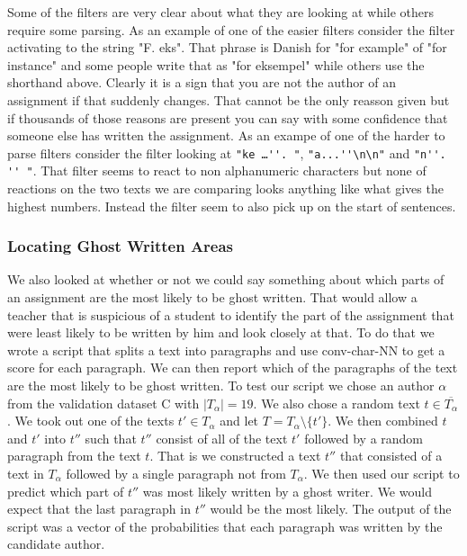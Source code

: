 Some of the filters are very clear about what they are looking at while others
require some parsing. As an example of one of the easier filters consider the
filter activating to the string "F. eks". That phrase is Danish for "for
example" of "for instance" and some people write that as "for eksempel" while
others use the shorthand above. Clearly it is a sign that you are not the author
of an assignment if that suddenly changes. That cannot be the only reasson given
but if thousands of those reasons are present you can say with some confidence
that someone else has written the assignment. As an exampe of one of the harder
to parse filters consider the filter looking at \verb["ke …''. "[,
\verb["a...''\n\n"[ and \verb["n''. '' "[. That filter seems to react to non
alphanumeric characters but none of reactions on the two texts we are comparing
looks anything like what gives the highest numbers. Instead the filter seem to
also pick up on the start of sentences.


\subsubsection{Locating Ghost Written Areas}

We also looked at whether or not we could say something about which parts of an
assignment are the most likely to be ghost written. That would allow a teacher
that is suspicious of a student to identify the part of the assignment that were
least likely to be written by him and look closely at that. To do that we wrote
a script that splits a text into paragraphs and use \gls{conv-char-NN} to get a
score for each paragraph. We can then report which of the paragraphs of the text
are the most likely to be ghost written. To test our script we chose an author
$\alpha$ from the validation dataset C with $|T_\alpha| = 19$. We also chose a
random text $t \in \overline{T_\alpha}$. We took out one of the texts $t' \in
T_\alpha$ and let $T = T_\alpha \setminus \{t'\}$. We then combined $t$ and $t'$
into $t''$ such that $t''$ consist of all of the text $t'$ followed by a random
paragraph from the text $t$. That is we constructed a text $t''$ that consisted
of a text in $T_\alpha$ followed by a single paragraph not from $T_\alpha$. We
then used our script to predict which part of $t''$ was most likely written by
a ghost writer. We would expect that the last paragraph in $t''$ would be the
most likely. The output of the script was a vector of the probabilities that
each paragraph was written by the candidate author.

